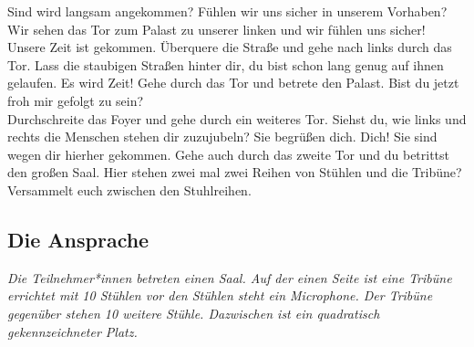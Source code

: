 \documentclass[a4paper, 12pt]{report}
\begin{document}
Sind wird langsam angekommen? 
Fühlen wir uns sicher in unserem Vorhaben?
Wir sehen das Tor zum Palast zu unserer linken und wir fühlen uns sicher! 
Unsere Zeit ist gekommen.
Überquere die Straße und gehe nach links durch das Tor. 
Lass die staubigen Straßen hinter dir, du bist schon lang genug auf ihnen gelaufen. 
Es wird Zeit!
Gehe durch das Tor und betrete den Palast.
Bist du jetzt froh mir gefolgt zu sein? \\

Durchschreite das Foyer und gehe durch ein weiteres Tor. 
Siehst du, wie links und rechts die Menschen stehen dir zuzujubeln?
Sie begrüßen dich. Dich! Sie sind wegen dir hierher gekommen.
Gehe auch durch das zweite Tor und du betrittst den großen Saal. 
Hier stehen zwei mal zwei Reihen von Stühlen und die Tribüne?
Versammelt euch zwischen den Stuhlreihen.

\subsection{Die Ansprache}
\textit{Die Teilnehmer*innen betreten einen Saal. Auf der einen Seite ist eine Tribüne errichtet mit 10 Stühlen vor den Stühlen steht ein Microphone. Der Tribüne gegenüber stehen 10 weitere Stühle. Dazwischen ist ein quadratisch gekennzeichneter Platz.}\\
\end{document}
